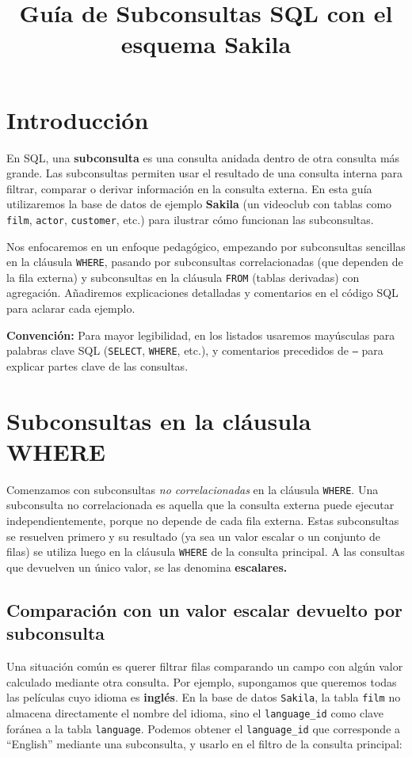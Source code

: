 \documentclass[12pt,a4paper]{article}
\title{\textbf{Guía de Subconsultas SQL con el esquema Sakila}}
\author{}
\date{}
\begin{document}
\maketitle 

\tableofcontents

\newpage
\section*{Introducción} 

En SQL, una \textbf{subconsulta} es una consulta anidada dentro de otra consulta más grande.
%
Las subconsultas permiten usar el resultado de una consulta interna para filtrar, comparar o derivar información en la consulta externa.
%
En esta guía utilizaremos la base de datos de ejemplo \textbf{Sakila} (un videoclub con tablas como \texttt{film}, \texttt{actor}, \texttt{customer}, etc.) para ilustrar cómo funcionan las subconsultas.

Nos enfocaremos en un enfoque pedagógico, empezando por subconsultas sencillas en la cláusula \texttt{WHERE}, pasando por subconsultas correlacionadas (que dependen de la fila externa) y subconsultas en la cláusula \texttt{FROM} (tablas derivadas) con agregación.
Añadiremos explicaciones detalladas y comentarios en el código SQL para aclarar cada ejemplo.

\textbf{Convención:} Para mayor legibilidad, en los listados usaremos mayúsculas para palabras clave SQL (\texttt{SELECT}, \texttt{WHERE}, etc.), y comentarios precedidos de \texttt{--} para explicar partes clave de las consultas. 


\section{Subconsultas en la cláusula WHERE} 


Comenzamos con subconsultas \emph{no correlacionadas} en la cláusula \texttt{WHERE}.
%
Una subconsulta no correlacionada es aquella que la consulta externa puede ejecutar independientemente, porque no depende de cada fila externa.
%
Estas subconsultas se resuelven primero y su resultado (ya sea un valor escalar o un conjunto de filas) se utiliza luego en la cláusula \texttt{WHERE} de la consulta principal. 
%
A las consultas que devuelven un único valor, se las denomina \textbf{escalares.}



\subsection*{Comparación con un valor escalar devuelto por subconsulta} Una situación común es querer filtrar filas comparando un campo con algún valor calculado mediante otra consulta.
%
Por ejemplo, supongamos que queremos todas las películas cuyo idioma es \textbf{inglés}.
%
En la base de datos \texttt{Sakila}, la tabla \texttt{film} no almacena directamente el nombre del idioma, sino el \texttt{language\_id} como clave foránea a la tabla \texttt{language}.
%
Podemos obtener el \texttt{language\_id} que corresponde a “English” mediante una subconsulta, y usarlo en el filtro de la consulta principal: 
\end{document}
